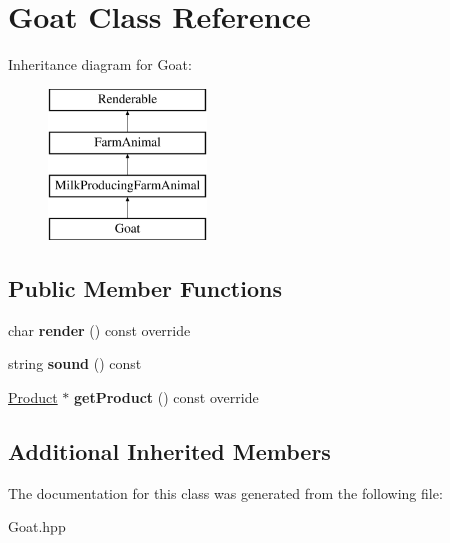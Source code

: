\hypertarget{class_goat}{}\section{Goat Class Reference}
\label{class_goat}
Inheritance diagram for Goat\+:\begin{figure}[H]
\begin{center}
\leavevmode
\includegraphics[height=4.000000cm]{class_goat}
\end{center}
\end{figure}
\subsection*{Public Member Functions}
\begin{DoxyCompactItemize}
\item 
\mbox{\label{class_goat_ac0a538ea14fc410514170ce69ffc4238}} 
char {\bfseries render} () const override
\item 
\mbox{\label{class_goat_a6e569ad95480ed000f276b86bb5b7379}} 
string {\bfseries sound} () const
\item 
\mbox{\label{class_goat_aa6101124675ddd7dabae91e66e33cb5e}} 
\mbox{\hyperlink{class_product}{Product}} $\ast$ {\bfseries get\+Product} () const override
\end{DoxyCompactItemize}
\subsection*{Additional Inherited Members}


The documentation for this class was generated from the following file\+:\begin{DoxyCompactItemize}
\item 
Goat.\+hpp\end{DoxyCompactItemize}
